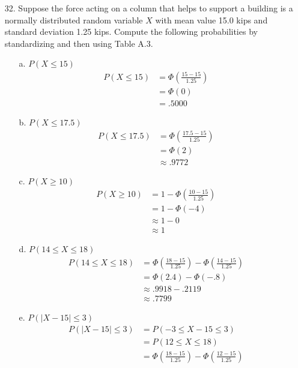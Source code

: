 \documentclass[letterpaper,12pt]{article}
\begin{document}
\begin{enumerate}
\begin{enumerate}
    \end{enumerate}
  \item[32.]
    Suppose the force acting on a column that helps to support a building is a normally distributed random variable $X$ with mean value 15.0 kips and standard deviation 1.25 kips. Compute the following probabilities by standardizing and then using Table A.3.
    \begin{enumerate}
      \item[a.]
        $P(X \le 15)$
        \begin{align*}
          P(X \le 15) &= \Phi\left(\frac{15 - 15}{1.25}\right) \\
          &= \Phi(0) \\
          &= .5000
        \end{align*}
      \item[b.]
        $P(X \le 17.5)$
        \begin{align*}
          P(X \le 17.5) &= \Phi\left(\frac{17.5 - 15}{1.25}\right) \\
          &= \Phi(2) \\
          &\approx .9772
        \end{align*}
      \item[c.]
        $P(X \ge 10)$
        \begin{align*}
          P(X \ge 10) &= 1 - \Phi\left(\frac{10 - 15}{1.25}\right) \\
          &= 1 - \Phi(-4) \\
          &\approx 1 - 0 \\
          &\approx 1
        \end{align*}
      \item[d.]
        $P(14 \le X \le 18)$
        \begin{align*}
          P(14 \le X \le 18) &= \Phi\left(\frac{18 - 15}{1.25}\right) - \Phi\left(\frac{14 - 15}{1.25}\right) \\
          &= \Phi(2.4) - \Phi(-.8) \\
          &\approx .9918 - .2119 \\
          &\approx .7799
        \end{align*}
      \item[e.]
        $P(|X - 15| \le 3)$
        \begin{align*}
          P(|X - 15| \le 3) &= P(-3 \le X - 15 \le 3) \\
          &= P(12 \le X \le 18) \\
          &= \Phi\left(\frac{18 - 15}{1.25}\right) - \Phi\left(\frac{12 - 15}{1.25}\right) \\

\end{align*}
\end{enumerate}
\end{enumerate}
\end{document}
